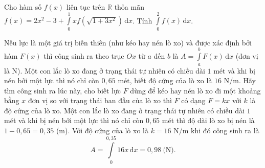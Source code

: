 \begin{bt}%
	Cho hàm số $f(x)$ liên tục trên $\mathbb{R}$ thỏa mãn $f(x)= 2x^2 -3 + \displaystyle \int\limits_{0}^{1} x f \left(\sqrt{1+3x^2 }\right) \mathrm{\,d}x$. Tính $\displaystyle \int\limits_{0}^{2} f(x) \mathrm{\,d}x$.
\end{bt}

\begin{bt}%
Nếu lực là một giá trị biến thiên (như kéo hay nén lò xo) và được xác định bởi hàm $F(x)$ thì công sinh ra theo trục $Ox$ từ $a$ đến $b$ là $A=\displaystyle\int\limits_{a}^{b} F(x)\mathrm{\,d}x$ (đơn vị là N). Một con lắc lò xo đang ở trạng thái tự nhiên có chiều dài $1$ mét và khi bị nén bởi một lực thì nó chỉ còn $0{,}65$ mét, biết độ cứng của lò xo là $16$ N/m. Hãy tìm công sinh ra lúc này, cho biết lực $F$ dùng để kéo hay nén lò xo đi một khoảng bằng $x$ đơn vị so với trạng thái ban đầu của lò xo thì $F$ có dạng $F=kx$ với $k$ là độ cứng của lò xo.
\loigiai
{
Một con lắc lò xo đang ở trạng thái tự nhiên có chiều dài $1$ mét và khi bị nén bởi một lực thì nó chỉ còn $0{,}65$ mét thì độ dài lò xo bị nén là $1-0{,}65=0{,}35$ (m). Với độ cứng của lò xo là $k=16$ N/m khi đó công sinh ra là
$$A=\displaystyle\int\limits_{0}^{0{,}35} 16x\mathrm{\,d}x=0{,}98 \ \text{(N).}$$
}
\end{bt}

